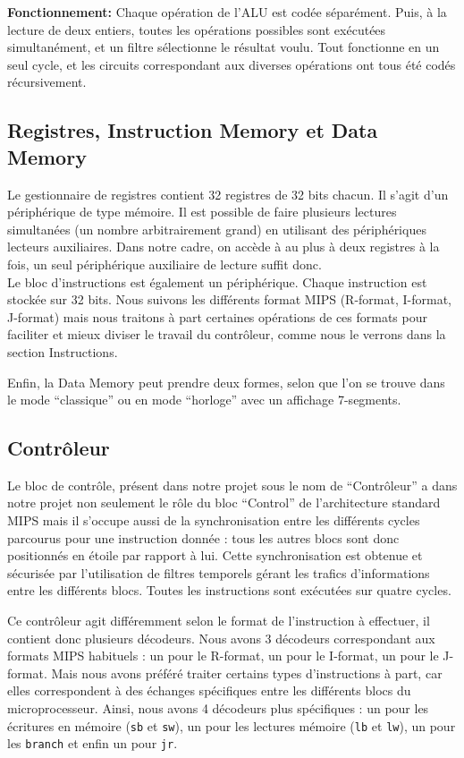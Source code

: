 \documentclass[13pt]{article}
\begin{document}
\textbf{Fonctionnement:} Chaque opération de l’ALU est codée séparément.
Puis, à la lecture de deux entiers, toutes les opérations possibles sont exécutées
simultanément, et un filtre sélectionne le résultat voulu. Tout fonctionne en un
seul cycle, et les circuits correspondant aux diverses opérations ont tous été
codés récursivement.

\subsection{Registres, Instruction Memory et Data Memory } 

Le gestionnaire de registres contient 32 registres de 32 bits chacun.
Il s'agit d'un périphérique de type mémoire. Il est possible de faire plusieurs
lectures simultanées (un nombre arbitrairement grand) en utilisant des périphériques
lecteurs auxiliaires. Dans notre cadre, on accède à au plus à deux registres à la fois, un seul 
périphérique auxiliaire de lecture suffit donc. \\

Le bloc d'instructions est également un périphérique. Chaque instruction est stockée
sur 32 bits. Nous suivons les différents format MIPS (R-format, I-format, J-format) mais
nous traitons à part certaines opérations de ces formats pour faciliter 
et mieux diviser le travail du 
contrôleur, comme nous le verrons dans la section Instructions.

Enfin, la Data Memory peut prendre deux formes, selon que l'on se trouve dans le
mode ``classique'' ou en mode ``horloge'' avec un affichage 7-segments. 

\subsection{Contrôleur}

Le bloc de contrôle, présent dans notre projet sous le nom de ``Contrôleur'' a
dans notre projet non seulement le rôle du bloc ``Control'' de l’architecture
standard MIPS mais il s’occupe aussi de la synchronisation entre les différents
cycles parcourus pour une instruction donnée : tous les autres blocs sont donc
positionnés en étoile par rapport à lui. Cette synchronisation est obtenue et
sécurisée par l’utilisation de filtres temporels gérant les trafics
d’informations entre les différents blocs. Toutes les instructions sont
exécutées sur quatre cycles.

Ce contrôleur agit différemment selon le format de l’instruction à effectuer, il
contient donc plusieurs décodeurs. Nous avons 3 décodeurs correspondant aux
formats MIPS habituels : un pour le R-format, un pour le I-format, un pour le
J-format. Mais nous avons préféré traiter certains types d'instructions à part,
car elles correspondent à des échanges spécifiques entre les différents blocs du
microprocesseur. Ainsi, nous avons 4 décodeurs plus spécifiques : un pour les
écritures en mémoire (\texttt{sb} et \texttt{sw}), un pour les lectures mémoire
(\texttt{lb} et \texttt{lw}), un pour les \texttt{branch} et enfin un pour
\texttt{jr}. 
\end{document}
